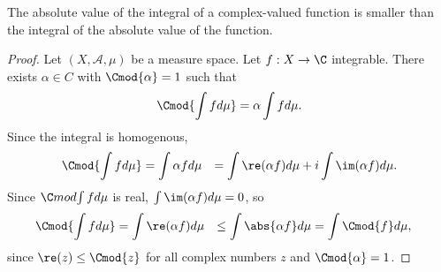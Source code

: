 \begin{proposition}
The absolute value of the integral of a complex-valued function is smaller than the integral of the absolute value of the function.
\begin{proof}Let $(X, \mathcal{A} , \mu )$ be a measure space.
Let $f: X \to \C $ integrable.
There exists $\alpha  \in C$ with $\Cmod{\alpha } = 1$ such that
\[
\Cmod{\int f d\mu } = \alpha  \int f d\mu .
\]
Since the integral is homogenous,
\[
\begin{aligned}
\Cmod{\int  f d\mu }
&= \int  \alpha  f d\mu
&= \int  \re(\alpha  f) d\mu  + i \int  \im(\alpha  f)d\mu .
\end{aligned}
\]
Since $\C mod{\int  f d\mu }$ is real, $\int  \im(\alpha  f) d\mu  = 0$, so
\[
\begin{aligned}
\Cmod{\int f d\mu }
&= \int  \re(\alpha  f) d\mu
&\leq \int  \abs{\alpha  f} d\mu
&= \int  \Cmod{f} d\mu ,
\end{aligned}
\]
since $\re(z) \leq \Cmod{z}$ for all complex numbers $z$ and $\Cmod{\alpha } = 1$.\end{proof}
\end{proposition}

